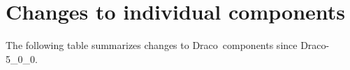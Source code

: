 \documentclass[note]{ResearchNote}
\newcommand{\draco}{Draco}
\newcommand{\dracor}{\draco-6\_0\_0}
\newcommand{\tableText}[1]{{\raggedright #1}}
\begin{document}
\section{Changes to individual components}
\label{sec:changes}
The following table summarizes changes to \draco\ components since
\draco-5\_0\_0. 
\end{document}
